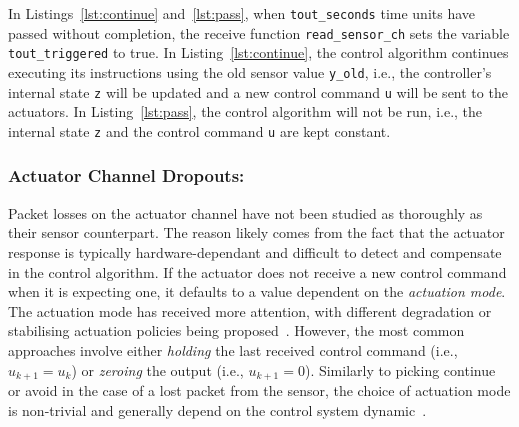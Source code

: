 In Listings~\ref{lst:continue} and~\ref{lst:pass}, when \texttt{tout\_seconds} time units have passed without completion, the receive function \texttt{read\_sensor\_ch} sets the variable \texttt{tout\_triggered} to true.
In Listing~\ref{lst:continue}, the control algorithm continues executing its instructions using the old sensor value \texttt{y\_old}, i.e., the controller's internal state \texttt{z} will be updated and a new control command \texttt{u} will be sent to the actuators.
In Listing~\ref{lst:pass}, the control algorithm will not be run, i.e., the internal state \texttt{z} and the control command \texttt{u} are kept constant.

\subsubsection*{Actuator Channel Dropouts:}
Packet losses on the actuator channel have not been studied as thoroughly as their sensor counterpart.
The reason likely comes from the fact that the actuator response is typically hardware-dependant and difficult to detect and compensate in the control algorithm.
If the actuator does not receive a new control command when it is expecting one, it defaults to a value dependent on the \emph{actuation mode}.
The actuation mode has received more attention, with different degradation or stabilising actuation policies being proposed~\cite{Ma:2018}.
However, the most common approaches involve either \emph{holding} the last received control command (i.e., $u_{k+1} = u_k$) or \emph{zeroing} the output (i.e., $u_{k+1}=0$).
Similarly to picking continue or avoid in the case of a lost packet from the sensor, the choice of actuation mode is non-trivial and generally depend on the control system dynamic~\cite{Schenato:2009, Vreman:2021}.

